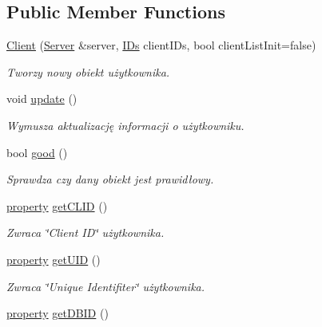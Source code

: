 \subsection*{Public Member Functions}
\begin{DoxyCompactItemize}
\item 
\hyperlink{class_ts3_api_1_1_client_ad63f5acca38e884294bdf24883fac068}{Client} (\hyperlink{class_ts3_api_1_1_server}{Server} \&server, \hyperlink{struct_ts3_api_1_1_client_1_1_i_ds}{I\+Ds} client\+I\+Ds, bool client\+List\+Init=false)
\begin{DoxyCompactList}\small\item\em Tworzy nowy obiekt użytkownika. \end{DoxyCompactList}\item 
void \hyperlink{class_ts3_api_1_1_client_a6e7a5e19c40bef39ae1c0f5996b8c471}{update} ()
\begin{DoxyCompactList}\small\item\em Wymusza aktualizację informacji o użytkowniku. \end{DoxyCompactList}\item 
bool \hyperlink{class_ts3_api_1_1_client_a52f9b3ce0e014563b757afdd6fff4628}{good} ()
\begin{DoxyCompactList}\small\item\em Sprawdza czy dany obiekt jest prawidłowy. \end{DoxyCompactList}\item 
\hyperlink{struct_ts3_api_1_1property}{property} \hyperlink{class_ts3_api_1_1_client_a22b13e80c0196fe504eb7eccfbc8c54f}{get\+C\+L\+ID} ()\hypertarget{class_ts3_api_1_1_client_a22b13e80c0196fe504eb7eccfbc8c54f}{}\label{class_ts3_api_1_1_client_a22b13e80c0196fe504eb7eccfbc8c54f}

\begin{DoxyCompactList}\small\item\em Zwraca \char`\"{}\+Client I\+D\char`\"{} użytkownika. \end{DoxyCompactList}\item 
\hyperlink{struct_ts3_api_1_1property}{property} \hyperlink{class_ts3_api_1_1_client_aae2b776db1783649cf2e9bf25b9a0a44}{get\+U\+ID} ()\hypertarget{class_ts3_api_1_1_client_aae2b776db1783649cf2e9bf25b9a0a44}{}\label{class_ts3_api_1_1_client_aae2b776db1783649cf2e9bf25b9a0a44}

\begin{DoxyCompactList}\small\item\em Zwraca \char`\"{}\+Unique Identifiter\char`\"{} użytkownika. \end{DoxyCompactList}\item 
\hyperlink{struct_ts3_api_1_1property}{property} \hyperlink{class_ts3_api_1_1_client_a852fdeb5b265cd32ba0f225277b0e097}{get\+D\+B\+ID} ()\hypertarget{class_ts3_api_1_1_client_a852fdeb5b265cd32ba0f225277b0e097}{}\label{class_ts3_api_1_1_client_a852fdeb5b265cd32ba0f225277b0e097}


\end{DoxyCompactItemize}
